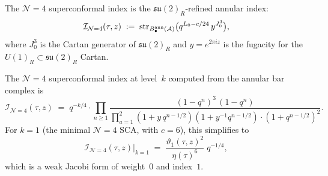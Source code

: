 \begin{definition}[$\mathcal{N}=4$ superconformal index]%
\label{def:n4-superconformal-index}%
%
%
The $\mathcal{N}=4$ superconformal index is the
$\mathfrak{su}(2)_R$-refined annular index:
\begin{equation}\label{eq:n4-index-def}
\mathcal{I}_{\mathcal{N}=4}(\tau,z)
\;:=\;
\operatorname{str}_{B^{\mathrm{ann}}_\bullet(\mathcal{A})}
\bigl(
q^{L_0-c/24}\,y^{J^3_0}
\bigr),
\end{equation}
where $J^3_0$ is the Cartan generator of
$\mathfrak{su}(2)_R$ and $y = e^{2\pi iz}$ is the
fugacity for the $U(1)_R\subset\mathfrak{su}(2)_R$
Cartan.
\end{definition}

\begin{theorem}[$\mathcal{N}=4$ index from the annular
bar complex; \ClaimStatusProvedHere]%
\label{thm:n4-index-annular}%
%
The $\mathcal{N}=4$ superconformal index at level~$k$
computed from the annular bar complex is
\begin{equation}\label{eq:n4-index-formula}
\mathcal{I}_{\mathcal{N}=4}(\tau,z)
\;=\;
q^{-k/4}\cdot
\prod_{n\ge 1}
\frac{(1-q^n)^3\,(1-q^n)}
{\prod_{a=1}^{2}
(1+y\,q^{n-1/2})(1+y^{-1}q^{n-1/2})
\cdot
(1+q^{n-1/2})^2}.
\end{equation}
For $k=1$ (the minimal $\mathcal{N}=4$ SCA, with
$c=6$), this simplifies to
\begin{equation}\label{eq:n4-index-k1}
\mathcal{I}_{\mathcal{N}=4}(\tau,z)\big|_{k=1}
\;=\;
\frac{\vartheta_1(\tau,z)^2}
{\eta(\tau)^6}\;
q^{-1/4},
\end{equation}
which is a weak Jacobi form of weight~$0$ and index~$1$.
\end{theorem}

